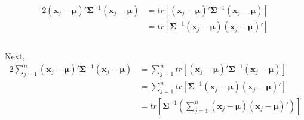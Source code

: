 \documentclass[a4paper,12pt]{article}
\newcommand{\varx}{\mathbf{x}}
\newcommand{\boldsigma}{\boldsymbol{\Sigma}}
\newcommand{\varmu}{\boldsymbol{\mu}}
\begin{document}
\begin{alignat*}{2}
    (\varx_j - \varmu)' \boldsigma^{-1} (\varx_j - \varmu) & = tr[(\varx_j - \varmu)' \boldsigma^{-1} (\varx_j - \varmu)] \\
    & = tr[\boldsigma^{-1} (\varx_j - \varmu) (\varx_j - \varmu)'] \tag*{(4-12)} \\
\end{alignat*}\\
Next, 
\begin{alignat*}{2}
    \sum_{j = 1}^{n} (\varx_j - \varmu)' \boldsigma^{-1} (\varx_j - \varmu) & = \sum_{j=1}^{n} tr[(\varx_j - \varmu)' \boldsigma^{-1} (\varx_j - \varmu)] \\
    & = \sum_{j=1}^{n} tr[\boldsigma^{-1} (\varx_j - \varmu) (\varx_j - \varmu)'] \\
    & = tr \left[ \boldsigma^{-1} \left( \sum_{j=1}^{n} (\varx_j - \varmu) (\varx_j - \varmu)' \right) \right] \tag{4-13} \label{eq:4-13} \\
\end{alignat*}
\end{document}
